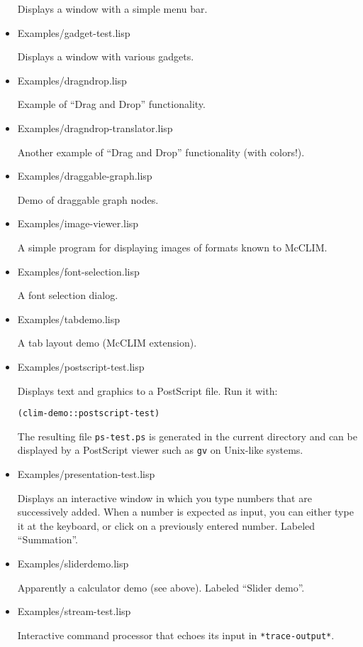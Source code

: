 \begin{itemize}
  Displays a window with a simple menu bar.

\item Examples/gadget-test.lisp

  Displays a window with various gadgets.

\item Examples/dragndrop.lisp

  Example of ``Drag and Drop'' functionality.

\item Examples/dragndrop-translator.lisp

  Another example of ``Drag and Drop'' functionality (with colors!).

\item Examples/draggable-graph.lisp

  Demo of draggable graph nodes.

\item Examples/image-viewer.lisp

  A simple program for displaying images of formats known to McCLIM.

\item Examples/font-selection.lisp

  A font selection dialog.

\item Examples/tabdemo.lisp

  A tab layout demo (McCLIM extension).

\item Examples/postscript-test.lisp

  Displays text and graphics to a PostScript file.  Run it with:

\begin{verbatim}
(clim-demo::postscript-test)
\end{verbatim}

  The resulting file \texttt{ps-test.ps} is generated in the current
  directory and can be displayed by a PostScript viewer such as
  \texttt{gv} on Unix-like systems.

\item Examples/presentation-test.lisp

  Displays an interactive window in which you type numbers that are
  successively added.  When a number is expected as input, you can
  either type it at the keyboard, or click on a previously entered
  number. Labeled ``Summation''.

\item Examples/sliderdemo.lisp

  Apparently a calculator demo (see above). Labeled ``Slider demo''.

\item Examples/stream-test.lisp

  Interactive command processor that echoes its input in
  \texttt{*trace-output*}.

\end{itemize}

